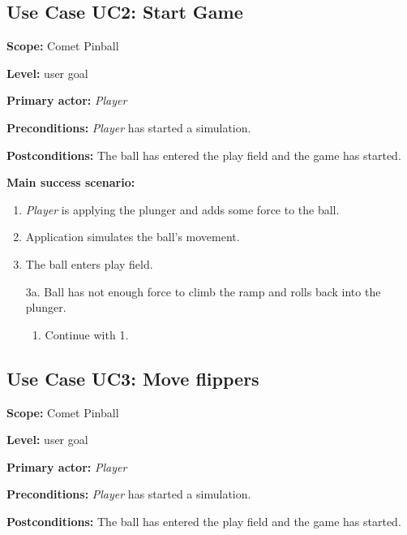 \documentclass[fontsize=12pt,
               paper=a4,
               twoside=false,
               parskip=half,
               ]{scrartcl}
\begin{document}

\subsection{Use Case UC2: Start Game}

\textbf{\textsf{Scope:}} Comet Pinball

\textbf{\textsf{Level:}} user goal

\textbf{\textsf{Primary actor:}} \emph{Player}

\textbf{\textsf{Preconditions:}} \emph{Player} has started a simulation.

\textbf{\textsf{Postconditions:}} The ball has entered the play field and the game has started.

\textbf{\textsf{Main success scenario:}}

\begin{enumerate}[leftmargin=3em]
	\item \emph{Player} is applying the plunger and adds some force to the ball.
	\item Application simulates the ball's movement.
	\item The ball enters play field.
\end{enumerate}


\begin{itemize}[leftmargin=3em]
	\item[3a.] Ball has not enough force to climb the ramp and rolls back into the plunger.
	\begin{enumerate}
		\item Continue with 1.
	\end{enumerate}
\end{itemize}





\subsection{Use Case UC3: Move flippers}

\textbf{\textsf{Scope:}} Comet Pinball

\textbf{\textsf{Level:}} user goal

\textbf{\textsf{Primary actor:}} \emph{Player}

\textbf{\textsf{Preconditions:}} \emph{Player} has started a simulation.

\textbf{\textsf{Postconditions:}} The ball has entered the play field and the game has started.
\end{document}
